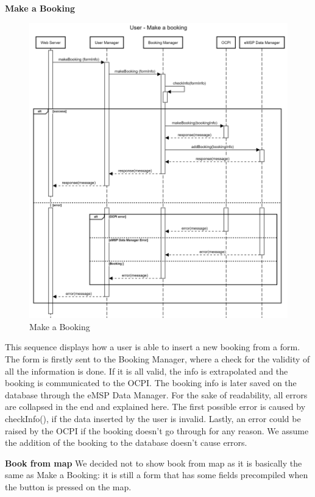 \documentclass[table, 12pt]{article}
\begin{document}
\newpage
\textbf{Make a Booking}
 \begin{center}
    \begin{figure}[H]
        \includegraphics[scale=0.15, center]{assets/sequenceDiagrams/User Make Booking.png}
        \caption{Make a Booking}
        \label{Make Booking}
    \end{figure}
\end{center}
This sequence displays how a user is able to insert a new booking from a form. The form is firstly sent to the Booking Manager, where a check for the validity of all the information is done. If it is all valid, the info is extrapolated and the 
booking is communicated to the OCPI. The booking info is later saved on the database through the eMSP Data Manager. For the sake of readability, all errors are collapsed in the end and explained here.
The first possible error is caused by checkInfo(), if the data inserted by the user is invalid. Lastly, an error could be raised by the OCPI if the booking doesn't go through for any reason. We assume the addition of the booking to the database doesn't cause errors.
\newline

\textbf{Book from map}\newline
We decided not to show book from map as it is basically the same as Make a Booking: it is still a form that has some fields precompiled when the button is pressed on the map.
\newpage
\end{document}
